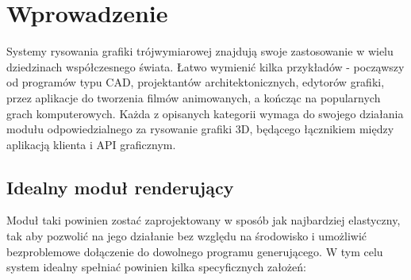 \chapter{Wprowadzenie}

Systemy rysowania grafiki trójwymiarowej znajdują swoje zastosowanie w wielu dziedzinach współczesnego świata. Łatwo wymienić kilka przykładów - począwszy od programów typu CAD, projektantów architektonicznych, edytorów grafiki, przez aplikacje do tworzenia filmów animowanych, a kończąc na popularnych grach komputerowych. Każda z opisanych kategorii wymaga do swojego działania modułu odpowiedzialnego za rysowanie grafiki 3D, będącego łącznikiem między aplikacją klienta i API graficznym. 

\section{Idealny moduł renderujący}

Moduł taki powinien zostać zaprojektowany w sposób jak najbardziej elastyczny, tak aby pozwolić na jego działanie bez względu na środowisko i umożliwić bezproblemowe dołączenie do dowolnego programu generującego. W tym celu system idealny spełniać powinien kilka specyficznych założeń:

